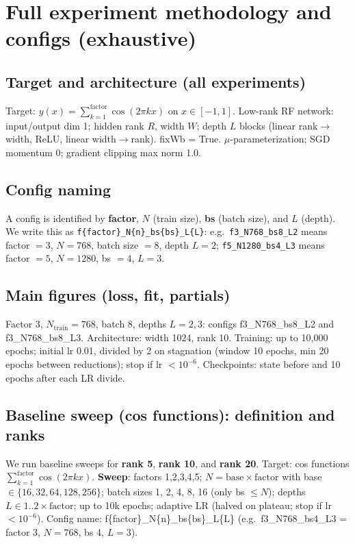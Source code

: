 \documentclass{article}
\theoremstyle{plain}
\theoremstyle{definition}
\begin{document}
\section{Full experiment methodology and configs (exhaustive)}
\label{app:methodology}

\subsection{Target and architecture (all experiments)}
Target: $y(x) = \sum_{k=1}^{\mathrm{factor}} \cos(2\pi k x)$ on $x \in [-1,1]$. Low-rank RF network: input/output dim 1; hidden rank $R$, width $W$; depth $L$ blocks (linear rank$\to$width, ReLU, linear width$\to$rank). fixWb = True. $\mu$-parameterization; SGD momentum 0; gradient clipping max norm 1.0.

\subsection{Config naming}
A config is identified by \textbf{factor}, \textbf{$N$} (train size), \textbf{bs} (batch size), and \textbf{$L$} (depth). We write this as \texttt{f\{factor\}\_N\{n\}\_bs\{bs\}\_L\{L\}}: e.g.\ \texttt{f3\_N768\_bs8\_L2} means factor $=3$, $N=768$, batch size $=8$, depth $L=2$; \texttt{f5\_N1280\_bs4\_L3} means factor $=5$, $N=1280$, bs $=4$, $L=3$.

\subsection{Main figures (loss, fit, partials)}
Factor 3, $N_{\mathrm{train}}=768$, batch 8, depths $L=2,3$: configs f3\_N768\_bs8\_L2 and f3\_N768\_bs8\_L3. Architecture: width 1024, rank 10. Training: up to 10,000 epochs; initial lr 0.01, divided by 2 on stagnation (window 10 epochs, min 20 epochs between reductions); stop if lr $< 10^{-6}$. Checkpoints: state before and 10 epochs after each LR divide.

\subsection{Baseline sweep (cos functions): definition and ranks}
\label{app:baseline-sweep}

We run baseline sweeps for \textbf{rank 5}, \textbf{rank 10}, and \textbf{rank 20}. Target: cos functions $\sum_{k=1}^{\mathrm{factor}}\cos(2\pi k x)$. \textbf{Sweep}: factors 1,2,3,4,5; $N = \mathrm{base} \times \mathrm{factor}$ with base $\in \{16,32,64,128,256\}$; batch sizes 1, 2, 4, 8, 16 (only bs $\le N$); depths $L \in 1..2{\times}\mathrm{factor}$; up to 10k epochs; adaptive LR (halved on plateau; stop if lr $< 10^{-6}$). Config name: f\{factor\}\_N\{n\}\_bs\{bs\}\_L\{L\} (e.g.\ f3\_N768\_bs4\_L3 = factor 3, $N=768$, bs 4, $L=3$).
\end{document}
